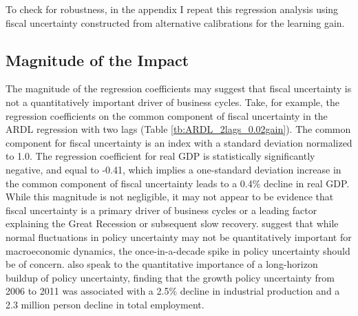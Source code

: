 \documentclass[11pt]{article}
\newcommand{\citee}[1]{\citet{#1}}
\begin{document}
To check for robustness, in the appendix I repeat this regression analysis using fiscal uncertainty constructed from alternative calibrations for the learning gain.  

\subsection{Magnitude of the Impact}\label{s:impact}
The magnitude of the regression coefficients may suggest that fiscal uncertainty is not a quantitatively important driver of business cycles.  Take, for example, the regression coefficients on the common component of fiscal uncertainty in the ARDL regression with two lags (Table \ref{tb:ARDL_2lags_0.02gain}).  The common component for fiscal uncertainty is an index with a standard deviation normalized to 1.0.  The regression coefficient for real GDP is statistically significantly negative, and equal to -0.41, which implies a one-standard deviation increase in the common component of fiscal uncertainty leads to a 0.4\% decline in real GDP.  While this magnitude is not negligible, it may not appear to be evidence that fiscal uncertainty is a primary driver of business cycles or a leading factor explaining the Great Recession or subsequent slow recovery.  \citee{fvetal2011} suggest that while normal fluctuations in policy uncertainty may not be quantitatively important for macroeconomic dynamics, the once-in-a-decade spike in policy uncertainty should be of concern.  \citee{baker2013} also speak to the quantitative importance of a long-horizon buildup of policy uncertainty, finding that the growth policy uncertainty from 2006 to 2011 was associated with a 2.5\% decline in industrial production and a 2.3 million person decline in total employment.
\end{document}
